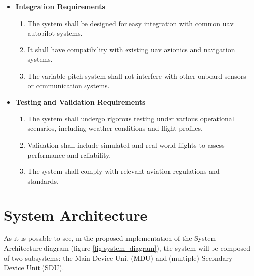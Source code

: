 \begin{itemize}
    \item \textbf{Integration Requirements}
          \begin{enumerate}[start=10,label={(\bfseries REQ\_\arabic*):},wide = 0pt, leftmargin = 3em]
              \item The system shall be designed for easy integration with common \gls{uav} autopilot systems.
              \item It shall have compatibility with existing \gls{uav} avionics and navigation systems.
              \item The variable-pitch system shall not interfere with other onboard sensors or communication systems.
          \end{enumerate}

    \item \textbf{Testing and Validation Requirements}
          \begin{enumerate}[start=13,label={(\bfseries REQ\_\arabic*):},wide = 0pt, leftmargin = 3em]
              \item The system shall undergo rigorous testing under various operational scenarios, including weather conditions and flight profiles.
              \item Validation shall include simulated and real-world flights to assess performance and reliability.
              \item The system shall comply with relevant aviation regulations and standards.
          \end{enumerate}
\end{itemize}

\section{System Architecture}
As it is possible to see, in the proposed implementation of the System Architecture diagram (figure \ref{fig:system_diagram}), the system will be composed of two subsystems: the Main Device Unit (MDU) and (multiple) Secondary Device Unit (SDU).

